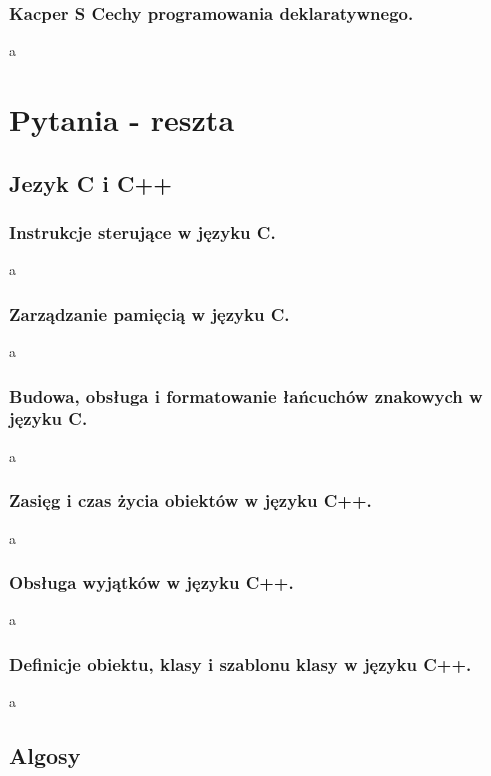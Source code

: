 \documentclass[a4paper,12pt,oneside]{book}
\begin{document}
			\newpage\subsection{\color{green} Kacper S \color{red}Cechy programowania deklaratywnego.}
				a
	
	\chapter{Pytania - reszta}
	
		\section{Jezyk C i C++}
			\subsection{\color{red}Instrukcje sterujące w języku C.}
				a
			\newpage\subsection{\color{red}Zarządzanie pamięcią w języku C.}
				a
			\newpage\subsection{\color{red}Budowa, obsługa i formatowanie łańcuchów znakowych w języku C.}
				a
			\newpage\subsection{\color{red}Zasięg i czas życia obiektów w języku C++.}
				a
			\newpage\subsection{\color{red}Obsługa wyjątków w języku C++.}
				a
			\newpage\subsection{\color{red}Definicje obiektu, klasy i szablonu klasy w języku C++.}
				a
		
		\newpage\section{Algosy}
\end{document}
